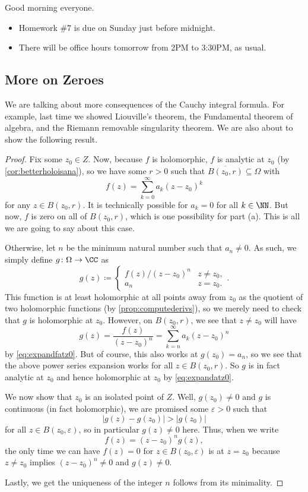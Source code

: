 
Good morning everyone.
\begin{itemize}
	\item Homework \#7 is due on Sunday just before midnight.
	\item There will be office hours tomorrow from 2PM to 3:30PM, as usual.
\end{itemize}

\subsection{More on Zeroes}
We are talking about more consequences of the Cauchy integral formula. For example, last time we showed Liouville's theorem, the Fundamental theorem of algebra, and the Riemann removable singularity theorem. We are also about to show the following result.
\isolatezeroes*
\begin{proof}
	Fix some $z_0\in Z$. Now, because $f$ is holomorphic, $f$ is analytic at $z_0$ (by \autoref{cor:betterholoisana}), so we have some $r>0$ such that $\overline{B(z_0,r)}\subseteq\Omega$ with
	\[f(z)=\sum_{k=0}^\infty a_k(z-z_0)^k\tag{$*$}\label{eq:expandfatz0}\]
	for any $z\in B(z_0,r)$. It is technically possible for $a_k=0$ for all $k\in\NN$. But now, $f$ is zero on all of $B(z_0,r)$, which is one possibility for part (a). This is all we are going to say about this case.
	
	Otherwise, let $n$ be the minimum natural number such that $a_n\ne0$. As such, we simply define $g\colon\Omega \to\CC$ as
	\[g(z)\coloneqq \begin{cases}
		f(z)/(z-z_0)^n & z\ne z_0, \\
		a_n & z=z_0.
	\end{cases}.\]
	This function is at least holomorphic at all points away from $z_0$ as the quotient of two holomorphic functions (by \autoref{prop:computederivs}), so we merely need to check that $g$ is holomorphic at $z_0$. However, on $B(z_0,r)$, we see that $z\ne z_0$ will have
	\[g(z)=\frac{f(z)}{(z-z_0)^n}=\sum_{k=n}^\infty a_k(z-z_0)^n\]
	by \autoref{eq:expandfatz0}. But of course, this also works at $g(z_0)=a_n$, so we see that the above power series expansion works for all $z\in B(z_0,r)$. So $g$ is in fact analytic at $z_0$ and hence holomorphic at $z_0$ by \autoref{eq:expandatz0}.

	We now show that $z_0$ is an isolated point of $Z$. Well, $g(z_0)\ne0$ and $g$ is continuous (in fact holomorphic), we are promised some $\varepsilon>0$ such that
	\[|g(z)-g(z_0)|>|g(z_0)|\]
	for all $z\in B(z_0,\varepsilon)$, so in particular $g(z)\ne0$ here. Thus, when we write
	\[f(z)=(z-z_0)^ng(z),\]
	the only time we can have $f(z)=0$ for $z\in B(z_0,\varepsilon)$ is at $z=z_0$ because $z\ne z_0$ implies $(z-z_0)^n\ne0$ and $g(z)\ne0$.

	Lastly, we get the uniqueness of the integer $n$ follows from its minimality. %
\end{proof}
